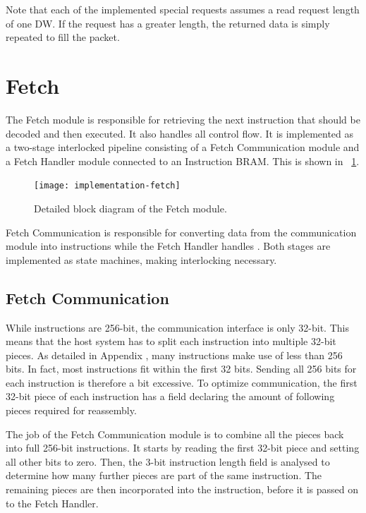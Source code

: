 Note that each of the implemented special requests assumes a read request length of one DW.
If the request has a greater length, the returned data is simply repeated to fill the packet.


\section{Fetch}

The Fetch module is responsible for retrieving the next instruction that should be decoded and then executed.
It also handles all control flow.
It is implemented as a two-stage interlocked pipeline consisting of a Fetch Communication module and a Fetch Handler module connected to an Instruction BRAM.
This is shown in \figurename~\ref{fig:implementation-fetch}.

\begin{figure}[!ht]
    \centering
    \texttt{[image: implementation-fetch]}
    \caption[Fetch module]{Detailed block diagram of the Fetch module.}
    \label{fig:implementation-fetch}
\end{figure}

Fetch Communication is responsible for converting data from the communication module into instructions while the Fetch Handler handles .
Both stages are implemented as state machines, making interlocking necessary.

\subsection{Fetch Communication}

While instructions are 256-bit, the communication interface is only 32-bit.
This means that the host system has to split each instruction into multiple 32-bit pieces.
As detailed in Appendix , many instructions make use of less than 256 bits.
In fact, most instructions fit within the first 32 bits.
Sending all 256 bits for each instruction is therefore a bit excessive.
To optimize communication, the first 32-bit piece of each instruction has a field declaring the amount of following pieces required for reassembly.

The job of the Fetch Communication module is to combine all the pieces back into full 256-bit instructions.
It starts by reading the first 32-bit piece and setting all other bits to zero.
Then, the 3-bit instruction length field is analysed to determine how many further pieces are part of the same instruction.
The remaining pieces are then incorporated into the instruction, before it is passed on to the Fetch Handler.

